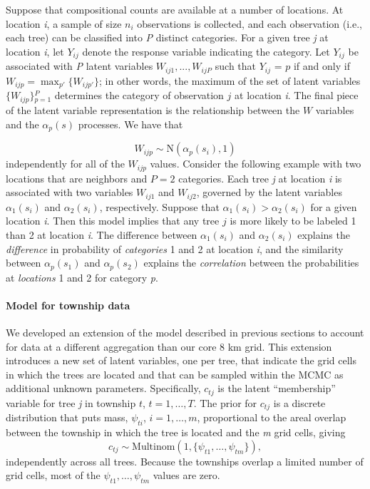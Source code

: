 \documentclass[10pt,letterpaper]{article}
\begin{document}
Suppose that compositional counts are available at a number of locations.
At location \emph{i}, a sample of size $n_{i}$ observations is collected,
and each observation (i.e., each tree) can be classified into \emph{P}
distinct categories. For a given tree \emph{j} at location \emph{i}, let $Y_{ij}$
denote the response variable indicating the category. Let $Y_{ij}$
be associated with \emph{P} latent variables $W_{ij1},...,W_{ijP}$ such
that $Y_{ij}$ = $p$ if and only if $W_{ijp}={\displaystyle \max_{p'}\big\{ W_{ijp'}\big\}}$;
in other words, the maximum of the set of latent variables $\{W_{ijp}\}{\displaystyle _{p=1}^{P}}$
determines the category of observation $j$ at location \emph{i}. The
final piece of the latent variable representation is the relationship
between the $W$ variables and the $\alpha_{p}(s)$ processes. We
have that

\noindent 
\[
W_{ijp}\sim\mbox{N}(\alpha_{p}(s_{i}),1)
\]
independently for all of the $W_{ijp}$ values. Consider the following
example with two locations that are neighbors and $P=2$ categories.
Each tree \emph{j} at location \emph{i} is associated with two variables $W_{ij1}$
and $W_{ij2}$, governed by the latent variables $\alpha_{1}(s_{i})$
and $\alpha_{2}(s_{i})$, respectively. Suppose that $\alpha_{1}(s_{i})>\alpha_{2}(s_{i})$
for a given location \emph{i}. Then this model implies that any tree $j$
is more likely to be labeled 1 than 2 at location \emph{i}. The difference
between $\alpha_{1}(s_{i})$ and $\alpha_{2}(s_{i})$ explains the
\textit{difference} in probability of \textit{categories} 1 and 2
at location \emph{i}, and the similarity between $\alpha_{p}(s_{1})$
and $\alpha_{p}(s_{2})$ explains the \textit{correlation} between
the probabilities at \textit{locations} 1 and 2 for category \emph{p}.




\paragraph*{Model for township data}
\label{sub:Model-for-township}

\linenumbers

We developed an extension of the model described in previous sections
to account for data at a different aggregation than our core 8 km
grid. This extension introduces a new set of latent variables, one
per tree, that indicate the grid cells in which the trees are located
and that can be sampled within the MCMC as additional unknown parameters.
Specifically, $c_{tj}$ is the latent ``membership'' variable for
tree \emph{j} in township $t$, $t=1,\ldots,T$. The prior for $c_{tj}$
is a discrete distribution that puts mass, $\psi_{ti}$, $i=1,\ldots,m$,
proportional to the areal overlap between the township in which the
tree is located and the \emph{m} grid cells, giving 
\[
c_{tj}\sim\mbox{Multinom}(1,\{\psi_{t1},\ldots,\psi_{tm}\}),
\]
independently across all trees. Because the townships overlap a limited
number of grid cells, most of the $\psi_{t1},\ldots,\psi_{tm}$ values
are zero.
\end{document}
